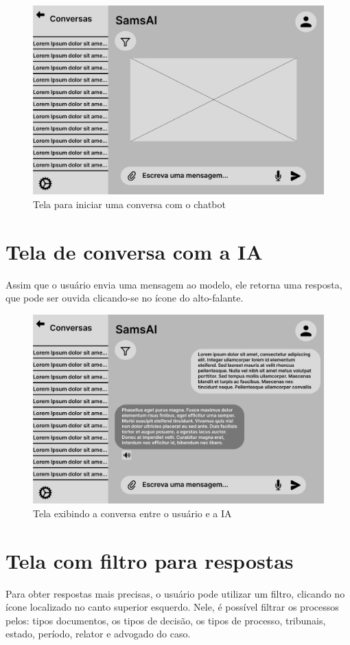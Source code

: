 \documentclass[
	12pt,				%
	openright,			%
	oneside,			    %
	a4paper,				%
	english,			%
	french,			%
	spanish,			%
	brazil			%
	]{abntex2}
\begin{document}
\begin{figure}[h]
    \centering
    \includegraphics[width=0.8\linewidth]{Tela Inicial.png}
    \caption{Tela para iniciar uma conversa com o chatbot}
    \label{fig:enter-label}
\end{figure}

\section{Tela de conversa com a IA}
Assim que o usuário envia uma mensagem ao modelo, ele retorna uma resposta, que pode ser ouvida clicando-se no ícone do alto-falante.

\begin{figure}[h]
    \centering
    \includegraphics[width=0.8\linewidth]{Tela de Conversa com a IA.png}
    \caption{Tela exibindo a conversa entre o usuário e a IA}
    \label{fig:enter-label}
\end{figure}

\section{Tela com filtro para respostas}
Para obter respostas mais precisas, o usuário pode utilizar um filtro, clicando no ícone localizado no canto superior esquerdo. Nele, é possível filtrar os processos pelos: tipos documentos, os tipos de decisão, os tipos de processo, tribunais, estado, período, relator e advogado do caso.
\end{document}
